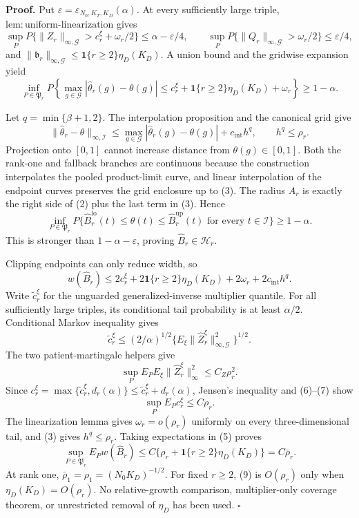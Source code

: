 \textbf{Proof.}
Put \(\varepsilon=\varepsilon_{N_0,K_T,K_D}(\alpha)\). At every sufficiently large triple, \(\mathrm{lem:uniform\mbox{-}linearization}\) gives
\[
 \sup_PP\{\|Z_r\|_{\infty,\mathcal G}>c_r^\xi+\omega_r/2\}
 \le\alpha-\varepsilon/4,
 \qquad
 \sup_PP\{\|Q_r\|_{\infty,\mathcal G}>\omega_r/2\}
 \le\varepsilon/4,                                      \tag{1}
\]
and \(\|\mathfrak b_r\|_{\infty,\mathcal G}\le\mathbf1\{r\ge2\}\eta_D(K_D)\). A union bound and the gridwise expansion yield
\[
 \inf_{P\in\mathfrak P_r}P\left\{
 \max_{g\in\mathcal G}|\widehat\theta_r(g)-\theta(g)|
 \le c_r^\xi+\mathbf1\{r\ge2\}\eta_D(K_D)+\omega_r
 \right\}\ge1-\alpha.                                  \tag{2}
\]

Let \(q=\min\{\beta+1,2\}\). The interpolation proposition and the canonical grid give
\[
 \|\widehat\theta_r-\theta\|_{\infty,\mathcal I}
 \le\max_{g\in\mathcal G}|\widehat\theta_r(g)-\theta(g)|
 +c_{\mathrm{int}}h^q,
 \qquad h^q\le\rho_r.                                   \tag{3}
\]
Projection onto \([0,1]\) cannot increase distance from \(\theta(g)\in[0,1]\). Both the rank-one and fallback branches are continuous because the construction interpolates the pooled product-limit curve, and linear interpolation of the endpoint curves preserves the grid enclosure up to (3). The radius \(A_r\) is exactly the right side of (2) plus the last term in (3). Hence
\[
 \inf_{P\in\mathfrak P_r}P\{\widehat B_r^{\mathrm{lo}}(t)
 \le\theta(t)\le\widehat B_r^{\mathrm{up}}(t)
 \text{ for every }t\in\mathcal I\}\ge1-\alpha.       \tag{4}
\]
This is stronger than \(1-\alpha-\varepsilon\), proving \(\widehat B_r\in\mathcal H_r\).

Clipping endpoints can only reduce width, so
\[
 w(\widehat B_r)
 \le2c_r^\xi+2\mathbf1\{r\ge2\}\eta_D(K_D)
 +2\omega_r+2c_{\mathrm{int}}h^q.                        \tag{5}
\]
Write \(\widetilde c_r^\xi\) for the unguarded generalized-inverse multiplier quantile. For all sufficiently large triples, its conditional tail probability is at least \(\alpha/2\). Conditional Markov inequality gives
\[
 \widetilde c_r^\xi
 \le(2/\alpha)^{1/2}
 \{E_\xi\|\widehat Z_r^\xi\|_{\infty,\mathcal G}^2\}^{1/2}. \tag{6}
\]
The two patient-martingale helpers give
\[
 \sup_PE_PE_\xi\|\widehat Z_r^\xi\|_\infty^2\le C_Z\rho_r^2. \tag{7}
\]
Since \(c_r^\xi=\max\{\widetilde c_r^\xi,d_r(\alpha)\}\le\widetilde c_r^\xi+d_r(\alpha)\), Jensen's inequality and (6)--(7) show
\[
 \sup_PE_Pc_r^\xi\le C\rho_r.                            \tag{8}
\]
The linearization lemma gives \(\omega_r=o(\rho_r)\) uniformly on every three-dimensional tail, and (3) gives \(h^q\le\rho_r\). Taking expectations in (5) proves
\[
 \sup_{P\in\mathfrak P_r}E_Pw(\widehat B_r)
 \le C\{\rho_r+\mathbf1\{r\ge2\}\eta_D(K_D)\}
 =C\bar\rho_r.                                           \tag{9}
\]
At rank one, \(\bar\rho_1=\rho_1=(N_0K_D)^{-1/2}\). For fixed \(r\ge2\), (9) is \(O(\rho_r)\) only when \(\eta_D(K_D)=O(\rho_r)\). No relative-growth comparison, multiplier-only coverage theorem, or unrestricted removal of \(\eta_D\) has been used. \(\square\)